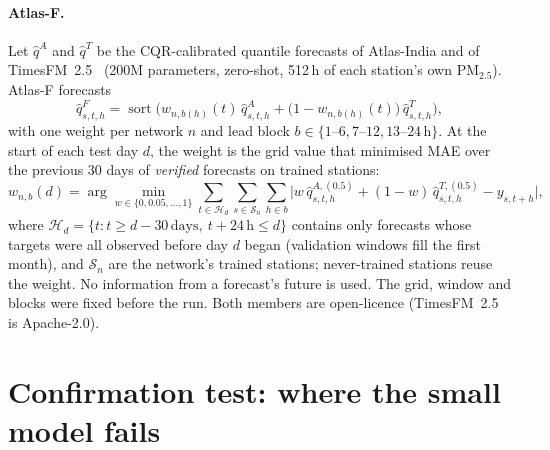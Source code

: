 \documentclass{article}
\newcommand{\pmtf}{PM$_{2.5}$}
\begin{document}
\paragraph{Atlas-F.} Let $\hat q^{A}$ and $\hat q^{T}$ be the CQR-calibrated quantile forecasts of Atlas-India and of
TimesFM~2.5~\citep{timesfm25} (200M parameters, zero-shot, 512\,h of each station's own \pmtf{}). Atlas-F forecasts
\begin{equation}
\hat q^{F}_{s,t,h} = \operatorname{sort}\Big(w_{n,b(h)}(t)\,\hat q^{A}_{s,t,h} + \big(1-w_{n,b(h)}(t)\big)\,\hat q^{T}_{s,t,h}\Big),
\label{eq:fuse}
\end{equation}
with one weight per network $n$ and lead block $b\in\{1\text{--}6, 7\text{--}12, 13\text{--}24\,\text{h}\}$. At the start of
each test day $d$, the weight is the grid value that minimised MAE over the previous 30 days of \emph{verified}
forecasts on trained stations:
\begin{equation}
w_{n,b}(d) = \arg\min_{w\in\{0,0.05,\dots,1\}} \sum_{t\in\mathcal{H}_{d}} \sum_{s\in\mathcal{S}_n} \sum_{h\in b}
\big|w\,\hat q^{A,(0.5)}_{s,t,h} + (1-w)\,\hat q^{T,(0.5)}_{s,t,h} - y_{s,t+h}\big|,
\label{eq:w}
\end{equation}
where $\mathcal{H}_d=\{t: t\ge d-30\,\text{days},\ t+24\,\text{h}\le d\}$ contains only forecasts whose targets were all
observed before day $d$ began (validation windows fill the first month), and $\mathcal{S}_n$ are the network's trained
stations; never-trained stations reuse the weight. No information from a forecast's future is used. The grid, window and
blocks were fixed before the run. Both members are open-licence (TimesFM~2.5 is Apache-2.0).

\section{Confirmation test: where the small model fails}
\label{sec:lono}
\end{document}
